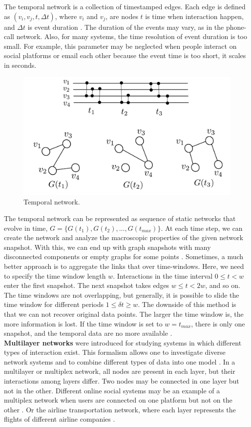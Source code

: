 The temporal network is a collection of timestamped edges. Each edge is defined as $(v_i, v_j, t, \Delta t)$, where $v_i$ and $v_j$, are nodes $t$ is time when interaction happen, and $\Delta t$ is event duration \cite{guide_temporal}. The duration of the events may vary, as in the phone-call network. Also, for many systems, the time resolution of event duration is too small. For example, this parameter may be neglected when people interact on social platforms or email each other because the event time is too short, it scales in seconds.

\begin{figure}[h!]
	\centering
	\includegraphics[width=0.7\linewidth]{figures/methodology/temporal_network.pdf} 
	\caption{Temporal network. }
	\label{fig:gt3}
\end{figure}

The temporal network can be represented as sequence of static networks that evolve in time, $G = \{ G(t_1), G(t_2), ..., G(t_{max})\}$. At each time step, we can create the network and analyze the macroscopic properties of the given network snapshot. With this, we can end up with graph snapshots with many disconnected components or empty graphs for some points \cite{holme2015modern}. Sometimes, a much better approach is to aggregate the links that over time-windows. Here, we need to specify the time window length $w$. Interactions in the time interval $0\leq t<w$ enter the first snapshot. The next snapshot takes edges $w \leq t <2w$, and so on. The time windows are not overlapping, but generally, it is possible to slide the time window for different periods $ 1 \leq \delta t \geq w$. The downside of this method is that we can not recover original data points. The larger the time window is, the more information is lost. If the time window is set to $w=t_{max}$, there is only one snapshot, and the temporal data are no more available \cite{krings2012effects, arnold2021moving}. \\

\textbf{Multilayer networks} were introduced for studying systems in which different types of interaction exist. This formalism allows one to investigate diverse network systems and to combine different types of data into one model \cite{porter2018multilayer}. In a multilayer or multiplex network, all nodes are present in each layer, but their interactions among layers differ. Two nodes may be connected in one layer but not in the other. Different online social systems may be an example of a multiplex network when users are connected on one platform but not on the other \cite{aleta2019multilayer}. Or the airline transportation network, where each layer represents the flights of different airline companies \cite{kivelamultilayer}.   

